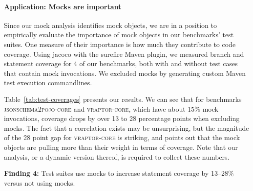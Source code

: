 \paragraph{Application: Mocks are important} Since our mock analysis identifies mock objects, we are in a position to empirically evaluate the importance of mock objects in our benchmarks' test suites. One measure of their importance is how much they contribute to code coverage. Using jacoco with the surefire Maven plugin, we measured branch and statement coverage for 4 of our benchmarks, both with and without test cases that contain mock invocations. We excluded mocks by generating custom Maven test execution commandlines. 

Table~\ref{tab:test-coverages} presents our results. We can see that for benchmarks \textsc{jsonschema2pojo-core} and \textsc{vraptor-core}, which have about 15\% mock invocations, coverage drops by over 13 to 28 percentage points when excluding mocks. The fact that a correlation exists may be unsurprising, but the magnitude of the 28 point gap for \textsc{vraptor-core} is striking, and points out that the mock objects are pulling more than their weight in terms of coverage. Note that our analysis, or a dynamic version thereof, is required to collect these numbers. 

\begin{mdframed}[
  leftmargin=\parindent,
  rightmargin=\parindent,
  skipabove=\topsep,
  skipbelow=\topsep
  ]
{\bf Finding 4:} Test suites use mocks to increase statement coverage by 13--28\% versus not using mocks.
\end{mdframed}





